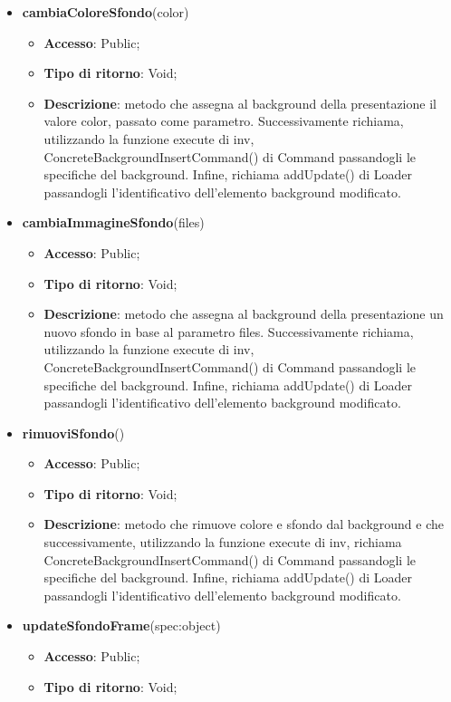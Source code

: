 {{\begin{itemize}
\begin{itemize}
			\end{itemize}
			\item \textbf{cambiaColoreSfondo}(color)
			\begin{itemize}
				\item \textbf{Accesso}: Public;
				\item \textbf{Tipo di ritorno}: Void;
				\item \textbf{Descrizione}: metodo che assegna al background della presentazione il valore color, passato come parametro. Successivamente richiama, utilizzando la funzione execute di inv, ConcreteBackgroundInsertCommand() di Command passandogli le specifiche del background. Infine, richiama addUpdate() di Loader passandogli l'identificativo dell'elemento background modificato.
			\end{itemize}
			\item \textbf{cambiaImmagineSfondo}(files)
			\begin{itemize}
				\item \textbf{Accesso}: Public;
				\item \textbf{Tipo di ritorno}: Void;
				\item \textbf{Descrizione}: metodo che assegna al background della presentazione un nuovo sfondo in base al parametro files. Successivamente richiama, utilizzando la funzione execute di inv, ConcreteBackgroundInsertCommand() di Command passandogli le specifiche del background. Infine, richiama addUpdate() di Loader passandogli l'identificativo dell'elemento background modificato.
			\end{itemize}
			\item \textbf{rimuoviSfondo}()
			\begin{itemize}
				\item \textbf{Accesso}: Public;
				\item \textbf{Tipo di ritorno}: Void;
				\item \textbf{Descrizione}: metodo che rimuove colore e sfondo dal background e che successivamente, utilizzando la funzione execute di inv, richiama ConcreteBackgroundInsertCommand() di Command passandogli le specifiche del background. Infine, richiama addUpdate() di Loader passandogli l'identificativo dell'elemento background modificato.
			\end{itemize}
			\item \textbf{updateSfondoFrame}(spec:object)
			\begin{itemize}
				\item \textbf{Accesso}: Public;
				\item \textbf{Tipo di ritorno}: Void;

\end{itemize}
\end{itemize}}}
